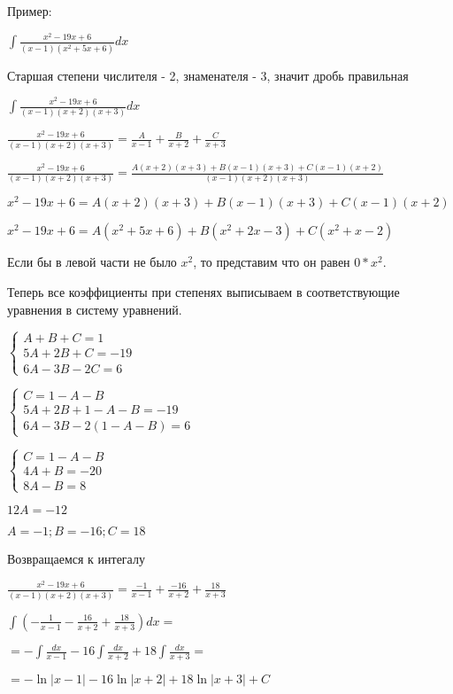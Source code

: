 \documentclass[12pt,a4paper]{article}
\begin{document}
Пример: 

$ \int{\frac{x^2-19x+6}{(x-1)(x^2+5x+6)}dx} $ 

Старшая степени числителя - 2, знаменателя - 3, значит дробь правильная 

$ \int{\frac{x^2-19x+6}{(x-1)(x+2)(x+3)}dx} $ 

$ \frac{x^2-19x+6}{(x-1)(x+2)(x+3)}=\frac{A}{x-1}+\frac{B}{x+2}+\frac{C}{x+3} $ 

$ \frac{x^2-19x+6}{(x-1)(x+2)(x+3)}=\frac{A(x+2)(x+3)+B(x-1)(x+3)+C(x-1)(x+2)}{(x-1)(x+2)(x+3)} $ 

$ x^2-19x+6=A(x+2)(x+3)+B(x-1)(x+3)+C(x-1)(x+2) $ 

$ x^2-19x+6=A(x^2+5x+6)+B(x^2+2x-3)+C(x^2+x-2) $ 

Если бы в левой части не было $x^2$, то представим что он равен $0*x^2$. 

Теперь все коэффициенты при степенях выписываем в соответствующие уравнения в систему уравнений. 

$\begin{cases}
A+B+C=1 \\
5A+2B+C=-19 \\
6A-3B-2C=6
\end{cases}$

$\begin{cases}
C=1-A-B \\
5A+2B+1-A-B=-19 \\
6A-3B-2(1-A-B)=6
\end{cases}$

$\begin{cases}
C=1-A-B \\
4A+B=-20 \\
8A-B=8
\end{cases}$

$ 12A=-12 $ 

$ A=-1; B=-16; C=18 $ 

Возвращаемся к интегалу 

$ \frac{x^2-19x+6}{(x-1)(x+2)(x+3)}=\frac{-1}{x-1}+\frac{-16}{x+2}+\frac{18}{x+3} $ 

$ \int{(-\frac{1}{x-1}-\frac{16}{x+2}+\frac{18}{x+3})dx}= $ 

$ =-\int{\frac{dx}{x-1}}-16\int{\frac{dx}{x+2}}+18\int{\frac{dx}{x+3}}= $ 

$ =-\ln|x-1|-16\ln|x+2|+18\ln|x+3|+C $ 
\end{document}
